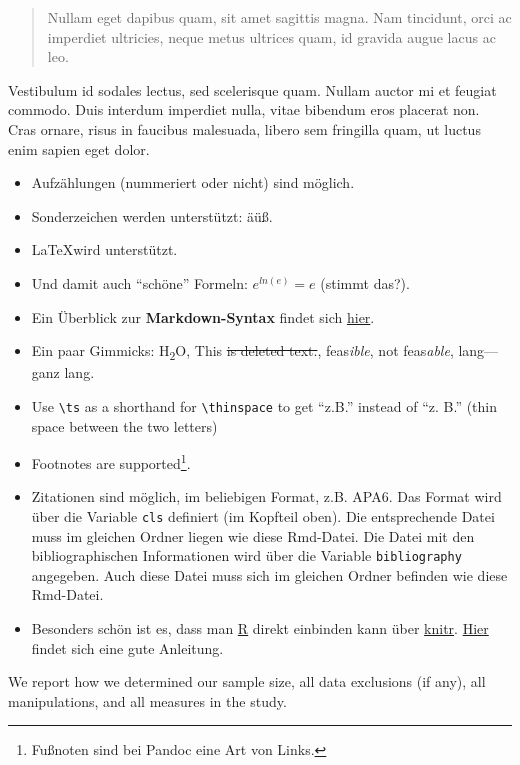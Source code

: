 \documentclass[11pt,ngerman,a4paper,oneside]{article}
\newcommand{\ts}{\thinspace}
\begin{document}
\begin{quote}
Nullam eget dapibus quam, sit amet sagittis magna. Nam tincidunt, orci
ac imperdiet ultricies, neque metus ultrices quam, id gravida augue
lacus ac leo.
\end{quote}

Vestibulum id sodales lectus, sed scelerisque quam. Nullam auctor mi et
feugiat commodo. Duis interdum imperdiet nulla, vitae bibendum eros
placerat non. Cras ornare, risus in faucibus malesuada, libero sem
fringilla quam, ut luctus enim sapien eget dolor.

\begin{itemize}
\item
  Aufzählungen (nummeriert oder nicht) sind möglich.
\item
  Sonderzeichen werden unterstützt: äüß.
\item
  \LaTeX wird unterstützt.
\item
  Und damit auch \enquote{schöne} Formeln: \(e^{ln(e)}=e\) (stimmt
  das?).
\item
  Ein Überblick zur \textbf{Markdown-Syntax} findet sich
  \href{http://pandoc.org/README.html\#pandocs-markdown}{hier}.
\item
  Ein paar Gimmicks: H\textsubscript{2}O, This \sout{is deleted text.},
  feas\emph{ible}, not feas\emph{able}, lang---ganz lang.
\item
  Use \texttt{\textbackslash{}ts} as a shorthand for
  \texttt{\textbackslash{}thinspace} to get \enquote{z.\ts B.} instead
  of \enquote{z. B.} (thin space between the two letters)
\item
  Footnotes are supported\footnote{Fußnoten sind bei Pandoc eine Art von
    Links.}.
\item
  Zitationen sind möglich, im beliebigen Format, z.B. APA6. Das Format
  wird über die Variable \texttt{cls} definiert (im Kopfteil oben). Die
  entsprechende Datei muss im gleichen Ordner liegen wie diese
  Rmd-Datei. Die Datei mit den bibliographischen Informationen wird über
  die Variable \texttt{bibliography} angegeben. Auch diese Datei muss
  sich im gleichen Ordner befinden wie diese Rmd-Datei.
\item
  Besonders schön ist es, dass man \href{https://cran.r-project.org}{R}
  direkt einbinden kann über \href{http://yihui.name/knitr/}{knitr}.
  \href{http://galahad.well.ox.ac.uk/repro/}{Hier} findet sich eine gute
  Anleitung.
\end{itemize}

We report how we determined our sample size, all data exclusions (if
any), all manipulations, and all measures in the study.
\end{document}
